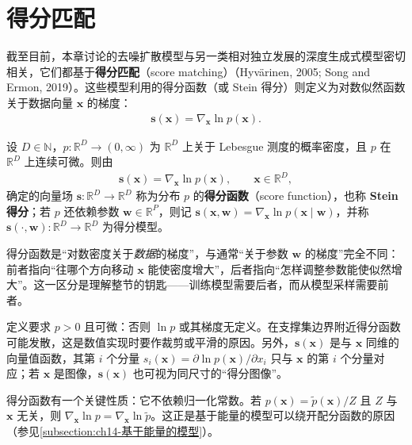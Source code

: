 \documentclass[../../main.tex]{subfiles}
\begin{document}
\section{得分匹配}\label{section:ch20-得分匹配}

截至目前，本章讨论的去噪扩散模型与另一类相对独立发展的深度生成式模型密切相关，它们都基于\textbf{得分匹配}（score matching）（Hyvärinen, 2005; Song and Ermon, 2019）。这些模型利用的得分函数（或 Stein 得分）则定义为对数似然函数关于数据向量 $\bm{x}$ 的梯度：
\begin{align}
\bm{s}(\bm{x})=\nabla_{\bm{x}}\ln p(\bm{x}).
\label{align:ch20-得分}
\end{align}

\begin{definition}[得分函数]\label{definition:ch20-得分函数}
设 $D\in\mathbb{N}$，$p:\mathbb{R}^{D}\to(0,\infty)$ 为 $\mathbb{R}^{D}$ 上关于 Lebesgue 测度的概率密度，且 $p$ 在 $\mathbb{R}^{D}$ 上连续可微。则由
\begin{align*}
\bm{s}(\bm{x})=\nabla_{\bm{x}}\ln p(\bm{x}),\qquad \bm{x}\in\mathbb{R}^{D},
\end{align*}
确定的向量场 $\bm{s}:\mathbb{R}^{D}\to\mathbb{R}^{D}$ 称为分布 $p$ 的\textbf{得分函数}（score function），也称 \textbf{Stein 得分}；若 $p$ 还依赖参数 $\bm{w}\in\mathbb{R}^{P}$，则记 $\bm{s}(\bm{x},\bm{w})=\nabla_{\bm{x}}\ln p(\bm{x}\mid\bm{w})$，并称 $\bm{s}(\cdot,\bm{w}):\mathbb{R}^{D}\to\mathbb{R}^{D}$ 为得分模型。
\end{definition}

\begin{remark}
得分函数是“对数密度关于\emph{数据}的梯度”，与通常“关于参数 $\bm{w}$ 的梯度”完全不同：前者指向“往哪个方向移动 $\bm{x}$ 能使密度增大”，后者指向“怎样调整参数能使似然增大”。这一区分是理解整节的钥匙——训练模型需要后者，而从模型采样需要前者。\par
定义要求 $p>0$ 且可微：否则 $\ln p$ 或其梯度无定义。在支撑集边界附近得分函数可能发散，这是数值实现时要作裁剪或平滑的原因。另外，$\bm{s}(\bm{x})$ 是与 $\bm{x}$ 同维的向量值函数，其第 $i$ 个分量 $s_i(\bm{x})=\partial\ln p(\bm{x})/\partial x_i$ 只与 $\bm{x}$ 的第 $i$ 个分量对应；若 $\bm{x}$ 是图像，$\bm{s}(\bm{x})$ 也可视为同尺寸的“得分图像”。\par
得分函数有一个关键性质：它不依赖归一化常数。若 $p(\bm{x})=\widetilde{p}(\bm{x})/Z$ 且 $Z$ 与 $\bm{x}$ 无关，则 $\nabla_{\bm{x}}\ln p=\nabla_{\bm{x}}\ln\widetilde{p}$。这正是基于能量的模型可以绕开配分函数的原因（参见\cref{subsection:ch14-基于能量的模型}）。
\end{remark}
\end{document}
